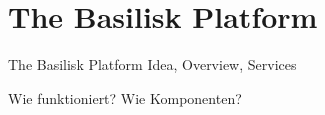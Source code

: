 \section{The Basilisk Platform}
\begin{frame}{The Basilisk Platform}
	Idea, Overview, Services
	
	Wie funktioniert?
	Wie Komponenten?
\end{frame}